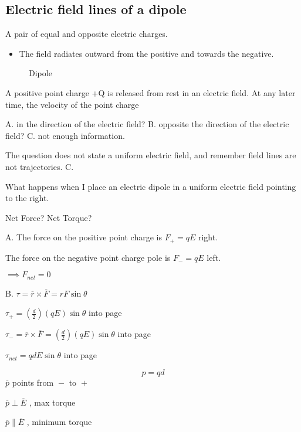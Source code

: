 \subsection{Electric field lines of a dipole}%
\label{sub:electric_field_lines_of_a_dipole}

\begin{definition}
	A pair of equal and opposite electric charges.
\end{definition}

\begin{itemize}
	\item The field radiates outward from the positive and towards the negative.
\end{itemize}

\begin{figure}[ht]
	\centering
	\caption{Dipole}
	\label{fig:dipole}
\end{figure}

\begin{example}[1]
	A positive point charge +Q is released from rest in an electric field. At any later time, the velocity
	of the point charge

	A. in the direction of the electric field?
	B. opposite the direction of the electric field?
	C. not enough information.
\end{example}
\begin{solution}[1]
	The question does not state a uniform electric field, and remember field lines are not trajectories. C.
\end{solution}

\begin{example}[2]
	What happens when I place an electric dipole in a uniform electric field pointing to the right.

	Net Force? Net Torque?
\end{example}

\begin{solution}[2]
	A.
	The force on the positive point charge is $F_{+} = q E $ right.

	The force on the negative point charge pole is $F_{-} = qE$ left.

	$\implies F_{net} = 0$

	B.
	$ \tau = \overline{r} \times \overline{F} = r F \sin \theta $

	$\tau_{+} = \left( \frac{d}{2} \right) (qE) \sin \theta $ into page

	$\tau_{-}= \overline{r} \times \overline{F} = \left( \frac{d}{2} \right) (qE) \sin \theta$ into page

	$\tau_{net}= qdE \sin \theta $ into page

	\begin{definition}
		\[\boxed{p = qd}\]
		$\overline{p}$ points from $\boxed{-}$ to $\boxed{+}$

		$\overline{p} \perp \overline{E}$ , max torque

		$\overline{p} \parallel \overline{E}$ , minimum torque
	\end{definition}

\end{solution}

